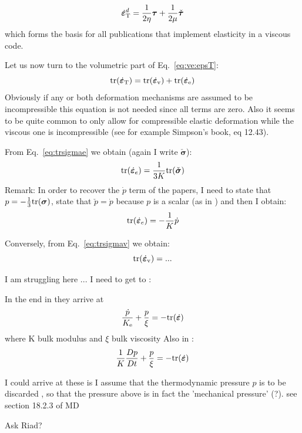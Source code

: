 \begin{equation}
\dot{\bm \varepsilon}_{\rm T}^d = 
\frac{1}{2\eta} {\bm \tau} + \frac{1}{2\mu} \check{\bm\tau}
\label{eq:ve:decomp}
\end{equation}
which forms the basis for all publications that implement elasticity in a viscous code.

Let us now turn to the volumetric part of Eq.~\eqref{eq:ve:epsT}: 
\begin{equation}
{\rm tr}(\dot{\bm \varepsilon}_{\rm T}) = {\rm tr}(\dot{\bm \varepsilon}_{\rm v}) + {\rm tr}(\dot{\bm \varepsilon}_{\rm e})
\end{equation}
Obviously if any or both deformation mechanisms are assumed to be incompressible this 
equation is not needed since all terms are zero. Also
it seems to be quite common to only allow for compressible elastic deformation while
the viscous one is incompressible (see for example Simpson's book, eq 12.43).

From Eq.~\eqref{eq:trsigmae} we obtain (again I write $\check{\bm \sigma}$): 
\begin{equation}
{\rm tr}(\dot{\bm \varepsilon}_e) = \frac{1}{3K} {\rm tr}(\check{\bm \sigma})
\end{equation}
Remark: In order to recover the $\dot{p}$ term of the papers, I need to state that $p=-\frac13 {\rm tr}({\bm \sigma})$, 
state that $\check{p}=\dot{p}$ because $p$ is a scalar (as in \cite{modm01}) and then I obtain:
\begin{equation}
{\rm tr}(\dot{\bm \varepsilon}_e) = - \frac{1}{K} \dot{p} 
\end{equation}


Conversely, from Eq.~\eqref{eq:trsigmav} we obtain:
\[
{\rm tr}(\dot{\bm \varepsilon}_{\rm v})  = ... 
\]

{\color{red} I am struggling here ... I need to get to :}


In the end in \cite{modm01} they arrive at
\[
\frac{\dot{p}}{K_{\rm e}}+\frac{p}{\xi} = - {\rm tr} (\dot{\bm \varepsilon})
\]
where K bulk modulus and $\xi$ bulk viscosity
Also in \cite{modm02}:
\[
\frac{1}{K} \frac{Dp}{Dt} + \frac{p}{\xi} = -{\rm tr}(\dot{\bm\varepsilon})
\]

{\color{red} I could arrive at these is I assume that the thermodynamic pressure $p$ is
to be discarded , so that the pressure above is in fact the 'mechanical pressure' (?). see section 18.2.3 of MD}

Ask Riad?



